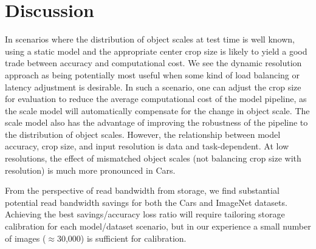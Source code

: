 \section{Discussion}
In scenarios where the distribution of object scales at test time is well known, using a static model and the appropriate center crop size is likely to yield a good trade between accuracy and computational cost.
We see the dynamic resolution approach as being potentially most useful when some kind of load balancing or latency adjustment is desirable.
In such a scenario, one can adjust the crop size for evaluation to reduce the average computational cost of the model pipeline, as the scale model will automatically compensate for the change in object scale.
The scale model also has the advantage of improving the robustness of the pipeline to the distribution of object scales.
However, the relationship between model accuracy, crop size, and input resolution is data and task-dependent.
At low resolutions, the effect of mismatched object scales (not balancing crop size with resolution) is much more pronounced in Cars.

From the perspective of read bandwidth from storage, we find substantial potential read bandwidth savings for both the Cars and ImageNet datasets.
Achieving the best savings/accuracy loss ratio will require tailoring storage calibration for each model/dataset scenario, but in our experience a small number of images ($\approx$30,000) is sufficient for calibration.

